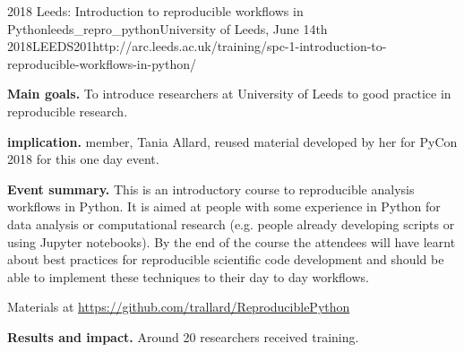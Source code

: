 \begin{event}{2018 Leeds: Introduction to reproducible workflows in Python}{leeds_repro_python}{University of Leeds, June 14th 2018}{LEEDS}{20}{1}{http://arc.leeds.ac.uk/training/spc-1-introduction-to-reproducible-workflows-in-python/}

\textbf{Main goals.} To introduce researchers at University of Leeds to good practice in reproducible research.

\textbf{\ODK implication.} \ODK member, Tania Allard, reused material developed by her for PyCon 2018 for this one day event.

\textbf{Event summary.} This is an introductory course to reproducible analysis workflows in Python. It is aimed at people with some experience in Python for data analysis or computational research (e.g. people already developing scripts or using Jupyter notebooks). By the end of the course the attendees will have learnt about best practices for reproducible scientific code development and should be able to implement these techniques to their day to day workflows.

Materials at \url{https://github.com/trallard/ReproduciblePython}

\textbf{Results and impact.} Around 20 researchers received training.

\end{event}
